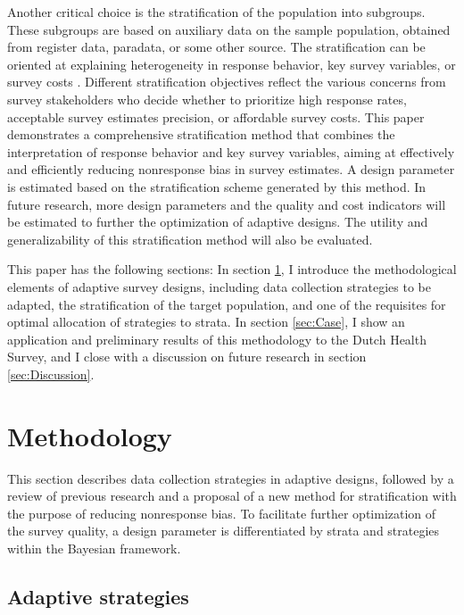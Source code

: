 \documentclass[11pt]{article}
\begin{document}
Another critical choice is the stratification of the population into subgroups. These subgroups are based on auxiliary data on the sample population, obtained from register data, paradata, or some other source. The stratification can be oriented at explaining heterogeneity in response behavior, key survey variables, or survey costs \cite{Schouten:2017:asd}. Different stratification objectives reflect the various concerns from survey stakeholders who decide whether to prioritize high response rates, acceptable survey estimates precision, or affordable survey costs. 
This paper demonstrates a comprehensive stratification method that combines the interpretation of response behavior and key survey variables, aiming at effectively and efficiently reducing nonresponse bias in survey estimates.
A design parameter is estimated based on the stratification scheme generated by this method. 
In future research, more design parameters and the quality and cost indicators will be estimated to further the optimization of adaptive designs. The utility and generalizability of this stratification method will also be evaluated.

This paper has the following sections: In section \ref{sec:Methodology}, I introduce the methodological elements of adaptive survey designs, including data collection strategies to be adapted, the stratification of the target population, and one of the requisites for optimal allocation of strategies to strata. In section \ref{sec:Case}, I show an application and preliminary results of this methodology to the Dutch Health Survey, and I close with a discussion on future research in section \ref{sec:Discussion}.


\section{Methodology}
\label{sec:Methodology}

This section describes data collection strategies in adaptive designs, followed by a review of previous research and a proposal of a new method for stratification with the purpose of reducing nonresponse bias. 
To facilitate further optimization of the survey quality, a design parameter is differentiated by strata and strategies within the Bayesian framework.

\subsection{Adaptive strategies}
\label{sec:strategies}
\end{document}
